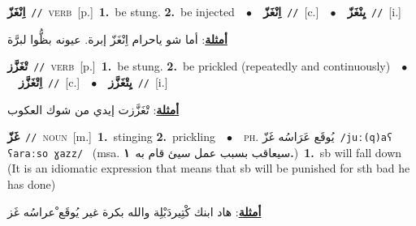 \documentclass[10pt,a4paper,twoside]{article} %
\begin{document}
\begin{multicols}{2}
{\setlength\topsep{0pt}\textbf{\foreignlanguage{arabic}{اِنْغَزّ}}\ {\color{gray}\texttt{//}\color{black}}\ \textsc{verb}\ [p.]\ \textbf{1.}~be stung.  \textbf{2.}~be injected\ \ $\bullet$\ \ \setlength\topsep{0pt}\textbf{\foreignlanguage{arabic}{اِنْغَزّ}}\ {\color{gray}\texttt{//}\color{black}}\ [c.]\ \ $\bullet$\ \ \setlength\topsep{0pt}\textbf{\foreignlanguage{arabic}{يِنْغَزّ}}\ {\color{gray}\texttt{//}\color{black}}\ [i.]\  \begin{flushright}\color{gray}\foreignlanguage{arabic}{\textbf{\underline{\foreignlanguage{arabic}{أمثلة}}}: أما شو ياحرام اِنْغَزّ إبرة. عيونه بظُّوا لبرَّة}\end{flushright}\color{black}} \vspace{2mm}

{\setlength\topsep{0pt}\textbf{\foreignlanguage{arabic}{تْغَزَّز}}\ {\color{gray}\texttt{//}\color{black}}\ \textsc{verb}\ [p.]\ \textbf{1.}~be stung.  \textbf{2.}~be prickled (repeatedly and continuously)\ \ $\bullet$\ \ \setlength\topsep{0pt}\textbf{\foreignlanguage{arabic}{اِتْغَزَّز}}\ {\color{gray}\texttt{//}\color{black}}\ [c.]\ \ $\bullet$\ \ \setlength\topsep{0pt}\textbf{\foreignlanguage{arabic}{يِتْغَزَّز}}\ {\color{gray}\texttt{//}\color{black}}\ [i.]\  \begin{flushright}\color{gray}\foreignlanguage{arabic}{\textbf{\underline{\foreignlanguage{arabic}{أمثلة}}}: تْغَزَّزت إيدي من شوك العكوب}\end{flushright}\color{black}} \vspace{2mm}

{\setlength\topsep{0pt}\textbf{\foreignlanguage{arabic}{غَزّ}}\ {\color{gray}\texttt{//}\color{black}}\ \textsc{noun}\ [m.]\ \textbf{1.}~stinging  \textbf{2.}~prickling\ \ $\bullet$\ \ \textsc{ph.} \color{gray} \foreignlanguage{arabic}{يُوقَع عَرَاسُه غَزّ}\color{black}\ {\color{gray}\texttt{/{\sffamily juː(q)aʕ ʕaraːso ɣazz}/}\color{black}}\ \color{gray} (msa. \foreignlanguage{arabic}{سيعاقب بسبب عمل سيئ قام به}~\foreignlanguage{arabic}{\textbf{١.}})\color{black}\ \textbf{1.}~sb will fall down (It is an idiomatic expression that means that sb will be punished for sth bad he has done)\  \begin{flushright}\color{gray}\foreignlanguage{arabic}{\textbf{\underline{\foreignlanguage{arabic}{أمثلة}}}: هاد ابنك كْتِيردَبْلِة والله بكرة غير يُوقَع ْعراسُه غَز}\end{flushright}\color{black}} \vspace{2mm}


\end{multicols}
\end{document}
